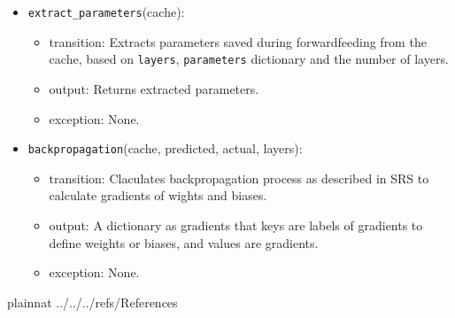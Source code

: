 \documentclass[12pt, titlepage]{article}
\def\code#1{\texttt{#1}}
\begin{document}
\begin{itemize}
  \item \code{extract\_parameters}(cache):
  \begin{itemize}
    \item transition: Extracts parameters saved during forwardfeeding from the cache, based on \code{layers},
    \code{parameters} dictionary and the number of layers.
    \item output: Returns extracted parameters.
    \item exception: None.
  \end{itemize}

  \item \code{backpropagation}(cache, predicted, actual, layers):
  \begin{itemize}
    \item transition: Claculates backpropagation process as described in SRS \cite{SRS} 
    to calculate gradients of wights and biases. 
    \item output: A dictionary as gradients that keys are labels of gradients to define weights or biases, 
    and values are gradients.
    \item exception: None.
  \end{itemize}

\end{itemize}

\newpage

 {plainnat}
 {../../../refs/References}

\newpage





\end{document}
